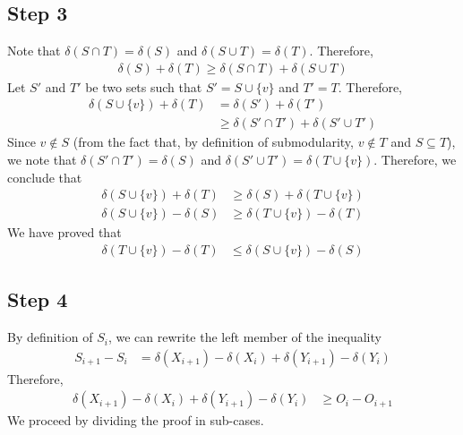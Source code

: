 \documentclass[a4paper,11pt]{article}
\begin{document}
\subsection{Step 3}
Note that $ \delta(S \cap T) = \delta(S)$ and $ \delta(S \cup T) = \delta(T)$. Therefore,
\begin{align*}
\delta(S) + \delta(T) \geq \delta(S \cap T) + \delta(S \cup T)
\end{align*}
Let $S'$ and $T'$ be two sets such that $S' = S \cup \{v\}$ and $T' = T$. Therefore,
\begin{align*}
\delta(S \cup \{v\}) + \delta(T) &=  \delta(S') + \delta(T')\\
&\geq \delta(S' \cap T') +  \delta(S' \cup T')
\end{align*}
Since $v \not \in S $ (from the fact that, by definition of submodularity, $v \not \in T$ and $S \subseteq T$), we note that $ \delta(S' \cap T') = \delta(S)$ and $\delta(S' \cup T') = \delta(T \cup \{v\})$. Therefore, we conclude that
\begin{align*}
\delta(S \cup \{v\}) + \delta(T)  &\geq \delta(S) +  \delta(T \cup \{v\})\\
\delta(S \cup \{v\}) - \delta(S)  &\geq \delta(T \cup \{v\}) - \delta(T) 
\end{align*}
We have proved that
\begin{align}
\delta(T \cup \{v\}) - \delta(T) &\leq \delta(S \cup \{v\}) - \delta(S) \label{3.4}
\end{align}


\subsection{Step 4}
By definition of $S_{i}$, we can rewrite the left member of the inequality
\begin{align*}
S_{i+1} - S_i &= \delta(X_{i+1}) - \delta(X_{i})  + \delta(Y_{i+1})  - \delta(Y_{i})
\end{align*}
Therefore,
\begin{align*}
\delta(X_{i+1}) - \delta(X_{i})  + \delta(Y_{i+1})  - \delta(Y_{i}) &\geq O_i - O_{i+1}	
\end{align*}
We proceed by dividing the proof in sub-cases.
\end{document}
